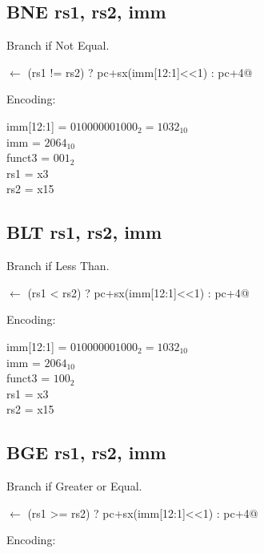 \subsection{BNE rs1, rs2, imm}

Branch if Not Equal.

\verb@pc@ $\leftarrow$ \verb@(rs1 != rs2) ? pc+sx(imm[12:1]<<1) : pc+4@

Encoding:


imm[12:1] = $010000001000_2 = 1032_{10}$\\
imm = $2064_{10}$\\
funct3 = $001_2$\\
rs1 = x3\\
rs2 = x15


\subsection{BLT rs1, rs2, imm}

Branch if Less Than.

\verb@pc@ $\leftarrow$ \verb@(rs1 < rs2) ? pc+sx(imm[12:1]<<1) : pc+4@

Encoding:


imm[12:1] = $010000001000_2 = 1032_{10}$\\
imm = $2064_{10}$\\
funct3 = $100_2$\\
rs1 = x3\\
rs2 = x15



\subsection{BGE rs1, rs2, imm}

Branch if Greater or Equal.

\verb@pc@ $\leftarrow$ \verb@(rs1 >= rs2) ? pc+sx(imm[12:1]<<1) : pc+4@

Encoding:


